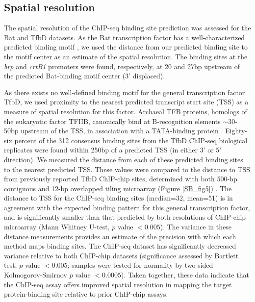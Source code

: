 \subsection{Spatial resolution}

The spatial resolution of the ChIP-seq binding site prediction was assessed for the Bat and TfbD datasets. As the Bat transcription factor has a well-characterized predicted binding motif \cite{baliga_genomic_2001}, we used the distance from our predicted binding site to the motif center as an estimate of the spatial resolution. The binding sites at the {\em brp} and {\em crtB1} promoters were found, respectively, at 20 and 27bp upstream of the predicted Bat-binding motif center (3' displaced).

As there exists no well-defined binding motif for the general transcription factor TfbD, we used proximity to the nearest predicted transcript start site (TSS) as a measure of spatial resolution for this factor. Archaeal TFB proteins, homologs of the eukaryotic factor TFIIB, canonically bind at B-recognition elements $\sim$30-50bp upstream of the TSS, in association with a TATA-binding protein \cite{bell_transcription_1998}. Eighty-six percent of the 312 consensus binding sites from the TfbD ChIP-seq biological replicates were found within 250bp of a predicted TSS (in either 3' or 5' direction). We measured the distance from each of these predicted binding sites to the nearest predicted TSS. These values were compared to the distance to TSS from previously reported TfbD ChIP-chip sites, determined with both 500-bp contiguous and 12-bp overlapped tiling microarray (Figure \ref{SB_fig5}) \cite{facciotti_general_2007}. The distance to TSS for the ChIP-seq binding sites (median=32, mean=51) is in agreement with the expected binding pattern for this general transcription factor, and is significantly smaller than that predicted by both resolutions of ChIP-chip microarray (Mann Whitney U-test, $p$ value $<0.005$). The variance in these distance measurements provides an estimate of the precision with which each method maps binding sites. The ChIP-seq dataset has significantly decreased variance relative to both ChIP-chip datasets (significance assessed by Bartlett test, $p$ value $<0.005$; samples were tested for normality by two-sided Kolmogorov-Smirnov $p$ value $<0.0005$). Taken together, these data indicate that the ChIP-seq assay offers improved spatial resolution in mapping the target protein-binding site relative to prior ChIP-chip assays.

